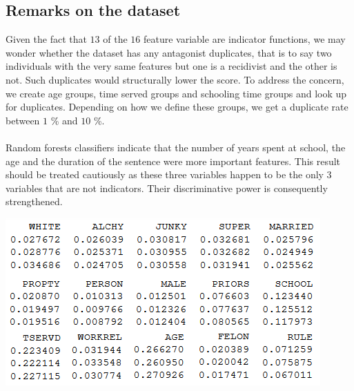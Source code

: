 \documentclass[a0,landscape]{a0poster}
\begin{document}
\begin{multicols}{4}
\section*{Remarks on the dataset}

Given the fact that $13$ of the $16$ feature variable are indicator functions, we may wonder whether the dataset has any antagonist duplicates, that is to say two individuals with the very same features but one is a recidivist and the other is not. Such duplicates would structurally lower the score. To address the concern, we create age groups, time served groups and schooling time groups and look up for duplicates. Depending on how we define these groups, we get a duplicate rate between $1$ \% and $10$ \%.

\paragraph{}
Random forests classifiers indicate that the number of years spent at school, the age and the duration of the sentence were more important features. This result should be treated cautiously as these three variables happen to be the only 3 variables that are not indicators. Their discriminative power is consequently strengthened.

\begin{center}\vspace{1cm}
  \includegraphics[width=\linewidth]{features_weights.png}
\end{center}\vspace{1cm}




\end{multicols}
\end{document}
